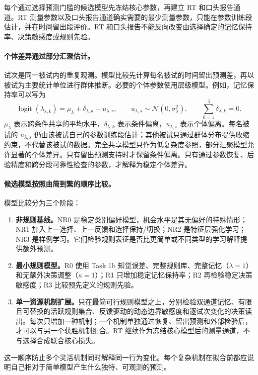 每个通过选择预测门槛的候选模型先冻结核心参数，再建立 RT 和口头报告通道。RT 测量参数以及口头报告通道确实需要的最少测量参数，只能在参数训练段估计，并在时间留出段评价。RT 和口头报告不能反向改变由选择确定的记忆保持率、决策敏感度或规则先验。

\paragraph{个体差异通过部分汇聚估计。}
试次是同一被试内的重复观测。模型比较先计算每名被试的时间留出预测差，再以被试为主要统计单位进行群体推断。必要的个体参数使用层级模型。例如，记忆保持率可以写为
\begin{equation}
    \operatorname{logit}(\lambda_{s,k})
    =\mu_\lambda+\delta_{\lambda,k}+u_{\lambda,s},
    \qquad u_{\lambda,s}\sim\mathcal N(0,\sigma_\lambda^2),
    \qquad \sum_{k=1}^{3}\delta_{\lambda,k}=0.
    \label{eq:newplan-hierarchical-memory}
\end{equation}
$\mu_\lambda$ 表示跨条件共享的平均水平，$\delta_{\lambda,k}$ 表示条件偏离，$u_{\lambda,s}$ 表示个体偏离。每名被试的 $u_{\lambda,s}$ 仍由该被试自己的参数训练段估计；其他被试只通过群体分布提供收缩约束，不代替该被试的数据。完全共享模型只作为低复杂度参照，部分汇聚模型允许显著的个体差异。只有留出预测支持时才保留条件偏离。只有通过参数恢复、后验精度和跨分段可靠性检查的参数，才解释为稳定个体差异。

\paragraph{候选模型按照由简到繁的顺序比较。}
模型比较分为三个阶段：
\begin{enumerate}
    \item \textbf{非规则基线。}NR0 是稳定类别偏好模型，机会水平是其无偏好的特殊情形；NR1 加入上一选择、上一反馈和选择保持/切换；NR2 是特征层强化学习；NR3 是样例学习。它们检验规则表征是否比更简单或不同类型的学习解释提供额外预测。
    \item \textbf{最小规则模型。}R0 使用 Task 1b 知觉误差、完整规则库、完整记忆（$\lambda=1$）和无额外决策调整（$\kappa=1$）；R1 只增加稳定记忆保持率；R2 再检验稳定决策敏感度；R3 比较预先定义的规则先验。
    \item \textbf{单一资源机制扩展。}只在最简可行规则模型之上，分别检验双通道记忆、有限且可替换的活跃规则集合、反馈驱动的动态边界敏感度和逐试次变化的决策读出。每次只增加一种机制；一个机制单独通过恢复、留出预测和外部检验后，才可以与另一个获胜机制组合。RT 继续作为冻结核心模型后的测量通道，不与选择合成联合核心损失。
\end{enumerate}
这一顺序防止多个灵活机制同时解释同一行为变化。每个复杂机制在拟合前都应说明自己相对于简单模型产生什么独特、可观测的预测。

